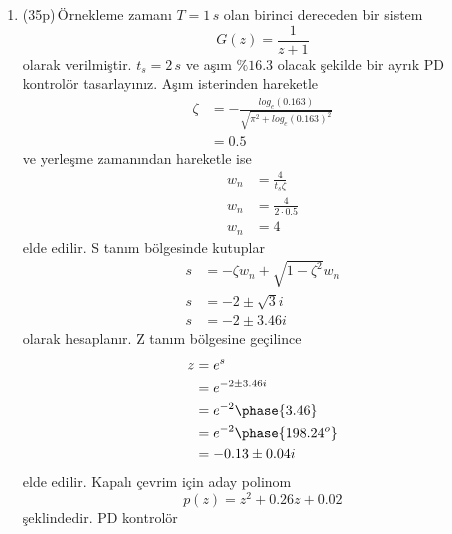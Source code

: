 \begin{enumerate}[\bfseries S1.]
    \item (35p)\,Örnekleme zamanı $T=1\,s$ olan birinci dereceden bir sistem 
    \begin{equation}
        G(z)=\frac{1}{z+1}
    \end{equation}
    olarak verilmiştir. $t_s=2\,s$ ve aşım $\%16.3$ olacak şekilde bir ayrık PD kontrolör tasarlayınız. Aşım isterinden hareketle
    \begin{equation}
    \begin{split}
        \zeta&=-\frac{log_e(0.163)}{\sqrt{\pi^2+log_e(0.163)^2}}\\
        &=0.5
    \end{split}
    \end{equation}
    ve yerleşme zamanından hareketle ise 
    \begin{equation}
        \begin{split}
            w_n&=\frac{4}{t_s\zeta}\\
            w_n&=\frac{4}{2\cdot 0.5}\\
            w_n&=4
        \end{split}
    \end{equation}
    elde edilir. S tanım bölgesinde kutuplar
    \begin{equation}
    \begin{split}
        s&=-\zeta w_n+\sqrt{1-\zeta^2}w_n\\
        s&=-2\pm \sqrt{3}i\\
        s&=-2\pm 3.46i
    \end{split}
    \end{equation}
    olarak hesaplanır. Z tanım bölgesine geçilince
    \begin{equation}
        \begin{split}
            z&=e^{s}\\
            &=e^{-2\pm 3.46i}\\
            &=e^{-2}\phase{3.46}\\
            &=e^{-2}\phase{198.24^o}\\
            &=-0.13\pm0.04i
        \end{split}
    \end{equation}
    elde edilir. Kapalı çevrim için aday polinom
    \begin{equation}
        p(z)=z^2+0.26z+0.02
    \end{equation}
    şeklindedir. PD kontrolör
    \begin{equation}

\end{equation}
\end{enumerate}
